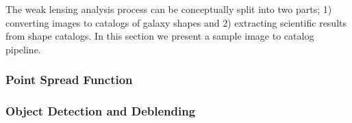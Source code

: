 The weak lensing analysis process can be conceptually split into two parts; 1) converting images to catalogs of galaxy shapes and 2) extracting scientific results from shape catalogs. In this section we present a sample image to catalog pipeline. 

\subsubsection{Point Spread Function}

\subsubsection{Object Detection and Deblending}



